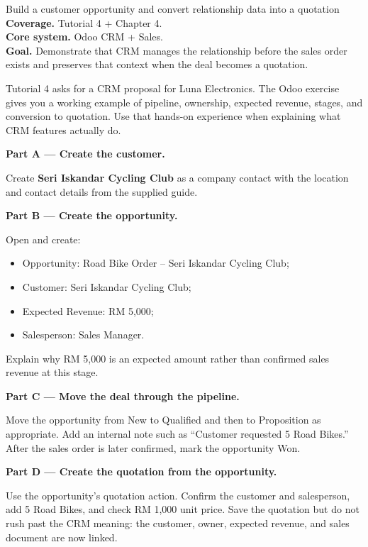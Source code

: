 
\begin{labproject}{Build a customer opportunity and convert relationship data into a quotation}
\textbf{Coverage.} Tutorial 4 + Chapter 4.\\
\textbf{Core system.} Odoo CRM + Sales.\\
\textbf{Goal.} Demonstrate that CRM manages the relationship before the sales order exists and preserves that context when the deal becomes a quotation.

\begin{labmode}
Tutorial 4 asks for a CRM proposal for Luna Electronics. The Odoo exercise gives you a working example of pipeline, ownership, expected revenue, stages, and conversion to quotation. Use that hands-on experience when explaining what CRM features actually do.
\end{labmode}

\medskip\noindent\textbf{Part A --- Create the customer.}

Create \textbf{Seri Iskandar Cycling Club} as a company contact with the location and contact details from the supplied guide.

\medskip\noindent\textbf{Part B --- Create the opportunity.}

Open  and create:
\begin{itemize}
  \item Opportunity: Road Bike Order -- Seri Iskandar Cycling Club;
  \item Customer: Seri Iskandar Cycling Club;
  \item Expected Revenue: RM 5,000;
  \item Salesperson: Sales Manager.
\end{itemize}

Explain why RM 5,000 is an expected amount rather than confirmed sales revenue at this stage.

\medskip\noindent\textbf{Part C --- Move the deal through the pipeline.}

Move the opportunity from New to Qualified and then to Proposition as appropriate. Add an internal note such as ``Customer requested 5 Road Bikes.'' After the sales order is later confirmed, mark the opportunity Won.

\medskip\noindent\textbf{Part D --- Create the quotation from the opportunity.}

Use the opportunity's quotation action. Confirm the customer and salesperson, add 5 Road Bikes, and check RM 1,000 unit price. Save the quotation but do not rush past the CRM meaning: the customer, owner, expected revenue, and sales document are now linked.


\end{labproject}
